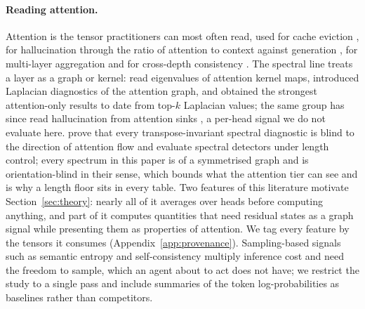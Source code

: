 \paragraph{Reading attention.}
Attention is the tensor practitioners can most often read, used for cache eviction \citep{zhang2023h2o},
for hallucination through the ratio of attention to context against generation \citep{chuang2024lookback},
for multi-layer aggregation \citep{abnar2020quantifying} and for cross-depth consistency
\citep{badash2026layers}. The spectral line treats a layer as a graph or kernel: \citet{sriramanan2024llmcheck}
read eigenvalues of attention kernel maps, \citet{noel2025gsp} introduced Laplacian diagnostics of the
attention graph, and \citet{binkowski2025lapeigvals} obtained the strongest attention-only results to date
from top-$k$ Laplacian values; the same group has since read hallucination from attention sinks
\citep{binkowski2026sinks}, a per-head signal we do not evaluate here. \citet{dahlem2026transport} prove that
every transpose-invariant spectral diagnostic is blind to the direction of attention flow and evaluate
spectral detectors under length control; every spectrum in this paper is of a symmetrised graph and is
orientation-blind in their sense, which bounds what the attention tier can see and is why a length floor
sits in every table. Two features of this literature motivate Section~\ref{sec:theory}: nearly all of it
averages over heads before computing anything, and part of it computes quantities that need residual states
as a graph signal while presenting them as properties of attention. We tag every feature by the tensors it
consumes (Appendix~\ref{app:provenance}). Sampling-based signals such as semantic entropy and
self-consistency \citep{farquhar2024semantic,manakul2023selfcheckgpt} multiply inference cost and need the
freedom to sample, which an agent about to act does not have; we restrict the study to a single pass and
include summaries of the token log-probabilities as baselines rather than competitors.
